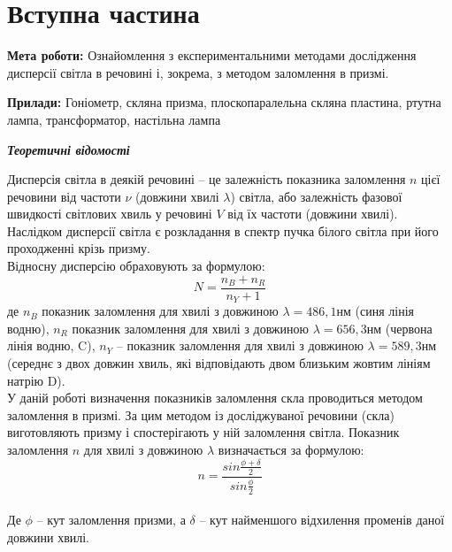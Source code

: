 \section{Вступна частина}
\setlength{\parindent}{4em}
\indent \textbf{Мета роботи:} Ознайомлення з експериментальними методами дослідження дисперсії світла в речовині і,
зокрема, з методом заломлення в призмі. \par
\textbf{Прилади:} Гоніометр, скляна призма, плоскопаралельна скляна пластина, ртутна лампа, трансформатор,
настільна лампа
\begin{center}
\textbf{\emph{Теоретичні відомості}}
\end{center}
Дисперсія світла в деякій речовині – це залежність показника заломлення $n$ цієї речовини від
частоти $\nu$ (довжини хвилі $\lambda$) світла, або залежність фазової швидкості світлових хвиль у речовині
$V$ від їх частоти (довжини хвилі). Наслідком дисперсії світла є розкладання в спектр пучка білого
світла при його проходженні крізь призму.\\
Відносну дисперсію обраховують за формулою:
$$N = \frac{n_B + n_R}{n_Y + 1}$$
де $n_B$ показник заломлення для хвилі з довжиною $\lambda=486,1нм$ (синя лінія водню), $n_R$ показник
заломлення для хвилі з довжиною $\lambda=656,3нм$ (червона лінія водню, C), $n_Y$ – показник заломлення
для хвилі з довжиною $\lambda=589,3нм$ (середнє з двох довжин хвиль, які відповідають двом близьким
жовтим лініям натрію D). \\
У даній роботі визначення показників заломлення скла проводиться методом заломлення в призмі.
За цим методом із досліджуваної речовини (скла) виготовляють призму і спостерігають у ній
заломлення світла. Показник заломлення $n$ для хвилі з довжиною $\lambda$ визначається за формулою:
$$n = \frac{sin\frac{\phi + \delta}{2}}{sin\frac{\phi}{2}}$$ \\
Де $\phi$ – кут заломлення призми, а $\delta$ – кут найменшого відхилення променів даної довжини хвилі.
